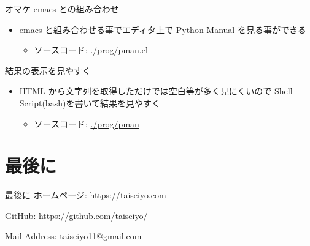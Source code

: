 \documentclass[compress,dvipdfmx,11pt]{beamer}
\begin{document}
\begin{frame}[label={sec:org1f90f1d}]{オマケ}
emacs との組み合わせ
\begin{itemize}
\item emacs と組み合わせる事でエディタ上で Python Manual を見る事ができる
\begin{itemize}
\item ソースコード: \url{./prog/pman.el}
\end{itemize}
\end{itemize}

結果の表示を見やすく
\begin{itemize}
\item HTML から文字列を取得しただけでは空白等が多く見にくいので Shell
Script(bash)を書いて結果を見やすく
\begin{itemize}
\item ソースコード:  \url{./prog/pman}
\end{itemize}
\end{itemize}
\end{frame}


\section{最後に}
\label{sec:orgd314976}
\begin{frame}[label={sec:org623e608}]{最後に}
ホームページ: \url{https://taiseiyo.com}


GitHub: \url{https://github.com/taiseiyo/}


Mail Address: taiseiyo11@gmail.com
\end{frame}
\end{document}
